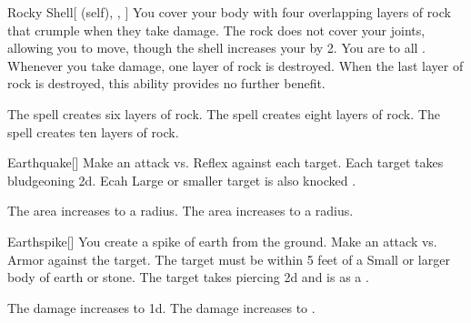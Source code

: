 \lowercase{\hypertarget{spell:Rocky Shell}{}}\label{spell:Rocky Shell}
\begin{attuneability}[Rank 2]{\hypertarget{spell:Rocky Shell}{Rocky Shell}}[ (self), , ]
You cover your body with four overlapping layers of rock that crumple when they take damage.
The rock does not cover your joints, allowing you to move, though the shell increases your  by 2.
You are  to all .
Whenever you take damage, one layer of rock is destroyed.
When the last layer of rock is destroyed, this ability provides no further benefit.

\rankline
{} The spell creates six layers of rock.
 The spell creates eight layers of rock.
 The spell creates ten layers of rock.

\end{attuneability}
\vspace{0.25em}



\lowercase{\hypertarget{spell:Earthquake}{}}\label{spell:Earthquake}
\begin{freeability}[Rank 3]{\hypertarget{spell:Earthquake}{Earthquake}}[]
Make an attack vs. Reflex against each target.
\hit Each target takes bludgeoning  \minus2d.
Ecah Large or smaller target is also knocked .

\rankline
{} The area increases to a \arealarge radius.
 The area increases to a \areahuge radius.

\end{freeability}
\vspace{0.25em}



\lowercase{\hypertarget{spell:Earthspike}{}}\label{spell:Earthspike}
\begin{freeability}[Rank 3]{\hypertarget{spell:Earthspike}{Earthspike}}[]
You create a spike of earth from the ground.
Make an attack vs. Armor against the target.
The target must be within 5 feet of a Small or larger body of earth or stone.
\hit The target takes piercing  \minus2d and is  as a .

\rankline
{} The damage increases to  \minus1d.
 The damage increases to .

\end{freeability}
\vspace{0.25em}



